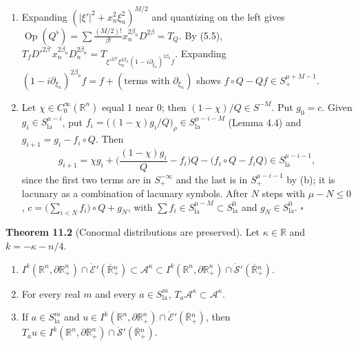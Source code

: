 \documentclass[
  11pt,
]{article}
\begin{document}
\begin{enumerate}
\def\labelenumi{(\alph{enumi})}
\setcounter{enumi}{1}
\item
  Expanding \((|\xi'|^2+x_n^2\xi_n^2)^{M/2}\) and quantizing on the left
  gives
  \(\operatorname{Op}(Q^\flat)=\sum\frac{(M/2)!}{\beta!}x_n^{2\beta_n}D^{2\beta}=T_Q\).
  By (5.5),
  \(T_fD'^{2\beta'}x_n^{2\beta_n}D_n^{2\beta_n}=T_{\xi'^{2\beta'}\xi_n^{2\beta_n}(1-i\partial_{\xi_n})^{2\beta_n}f}\).
  Expanding
  \((1-i\partial_{\xi_n})^{2\beta_n}f=f+(\text{terms with }\partial_{\xi_n})\)
  shows \(f\circ Q-Qf\in S^{\mu+M-1}_+\).
\item
  Let \(\chi\in C_0^\infty(\mathbb R^n)\) equal 1 near 0; then
  \((1-\chi)/Q\in S^{-M}\). Put \(g_0=c\). Given
  \(g_i\in S^{\mu-i}_{\mathrm{la}}\), put
  \(f_i=\big((1-\chi)g_i/Q\big)_\rho\in S^{\mu-i-M}_{\mathrm{la}}\)
  (Lemma 4.4) and \(g_{i+1}=g_i-f_i\circ Q\). Then \[
g_{i+1}=\chi g_i+\Big(\frac{(1-\chi)g_i}Q-f_i\Big)Q-\big(f_i\circ Q-f_iQ\big)\in S^{\mu-i-1}_{\mathrm{la}},
\] since the first two terms are in \(S^{-\infty}_+\) and the last is
  in \(S^{\mu-i-1}_+\) by (b); it is lacunary as a combination of
  lacunary symbols. After \(N\) steps with \(\mu-N\leq0\),
  \(c=\big(\sum_{i<N}f_i\big)\circ Q+g_N\), with
  \(\sum f_i\in S^{\mu-M}_{\mathrm{la}}\subset S^0_{\mathrm{la}}\) and
  \(g_N\in S^0_{\mathrm{la}}\). \(\square\)
\end{enumerate}

\textbf{Theorem 11.2} (Conormal distributions are preserved). Let
\(\kappa\in\mathbb R\) and \(k=-\kappa-n/4\).

\begin{enumerate}
\def\labelenumi{(\alph{enumi})}
\item
  \(I^k(\mathbb R^n,\partial\mathbb R^n_+)\cap\dot{\mathcal E}'(\overline{\mathbb R}{}^n_+)\subset\mathcal A^\kappa\subset I^k(\mathbb R^n,\partial\mathbb R^n_+)\cap\dot{\mathcal S}'(\overline{\mathbb R}{}^n_+)\).
\item
  For every real \(m\) and every \(a\in S^m_{\mathrm{la}}\),
  \(T_a\mathcal A^\kappa\subset\mathcal A^\kappa\).
\item
  If \(a\in S^m_{\mathrm{la}}\) and
  \(u\in I^k(\mathbb R^n,\partial\mathbb R^n_+)\cap\dot{\mathcal E}'(\overline{\mathbb R}{}^n_+)\),
  then
  \(T_au\in I^k(\mathbb R^n,\partial\mathbb R^n_+)\cap\dot{\mathcal S}'(\overline{\mathbb R}{}^n_+)\).
\end{enumerate}
\end{document}
